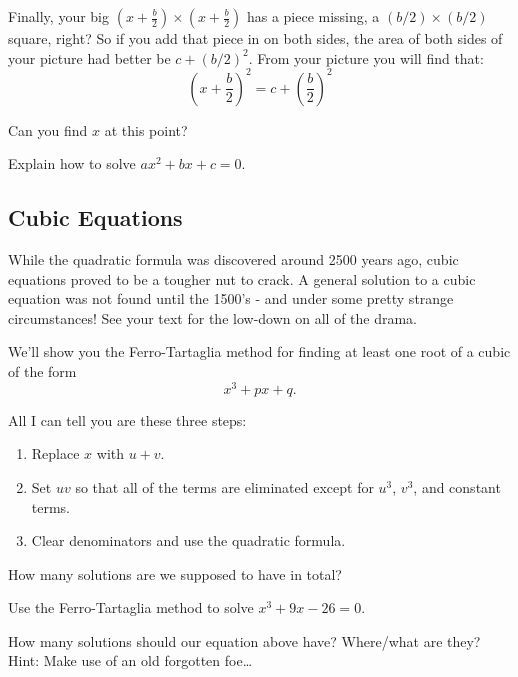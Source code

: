 \documentclass[nooutcomes]{ximera}
\begin{document}
Finally, your big $(x + \frac{b}{2}) \times (x + \frac{b}{2})$ has a
piece missing, a $(b/2) \times (b/2)$ square, right? So if you add
that piece in on both sides, the area of both sides of your picture
had better be $c + (b/2)^2$. From your picture you will find that:
\[
\left(x + \frac{b}{2}\right)^2 = c + \left(\frac{b}{2}\right)^2
\]

\begin{question} 
Can you find $x$ at this point?
\end{question}


\begin{question}
Explain how to solve $ax^2 + bx + c = 0$.
\end{question}



\subsection*{Cubic Equations}

While the quadratic formula was discovered around 2500 years ago,
cubic equations proved to be a tougher nut to crack. A general
solution to a cubic equation was not found until the 1500's - and under some pretty strange circumstances!  See your text for the low-down on all of the drama.

We'll show you the Ferro-Tartaglia method for finding at least one root of a cubic of the form
\[
x^3+ px + q.
\]

All I can tell you are these three steps:
\begin{enumerate}
\item Replace $x$ with $u+v$. 
\item Set $uv$ so that all of the terms are eliminated except for $u^3$,
$v^3$, and constant terms.  
\item Clear denominators and use the quadratic formula.
\end{enumerate}



\begin{question} How many solutions are we supposed to have in total?
\end{question}

\begin{question}
Use the Ferro-Tartaglia method to solve $x^3 + 9x -26 =0$.
\end{question}

\begin{question}
How many solutions should our equation above have? Where/what are they?
Hint: Make use of an old forgotten foe\dots
\end{question}
\end{document}
